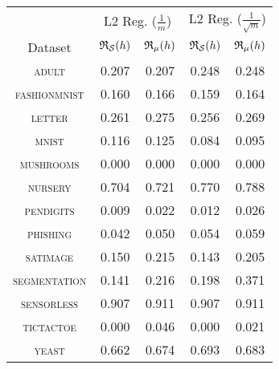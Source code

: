 \begin{tabular}{c|cc|cc}
\toprule
  & \multicolumn{2}{c}{L2 Reg. {\small ($\frac{1}{m}$)}} & \multicolumn{2}{c}{L2 Reg. {\small ($\frac{1}{\sqrt{m}}$)}} \\
Dataset & {\scriptsize $\mathfrak{R}_{\mathcal{S}}(h)$} & {\scriptsize $\mathfrak{R}_{\mu}(h)$} & {\scriptsize $\mathfrak{R}_{\mathcal{S}}(h)$} & {\scriptsize $\mathfrak{R}_{\mu}(h)$} \\
\midrule
\textsc{\footnotesize adult} & 0.207 & 0.207 & 0.248 & 0.248 \\
\textsc{\footnotesize fashionmnist} & 0.160 & 0.166 & 0.159 & 0.164 \\
\textsc{\footnotesize letter} & 0.261 & 0.275 & 0.256 & 0.269 \\
\textsc{\footnotesize mnist} & 0.116 & 0.125 & 0.084 & 0.095 \\
\textsc{\footnotesize mushrooms} & 0.000 & 0.000 & 0.000 & 0.000 \\
\textsc{\footnotesize nursery} & 0.704 & 0.721 & 0.770 & 0.788 \\
\textsc{\footnotesize pendigits} & 0.009 & 0.022 & 0.012 & 0.026 \\
\textsc{\footnotesize phishing} & 0.042 & 0.050 & 0.054 & 0.059 \\
\textsc{\footnotesize satimage} & 0.150 & 0.215 & 0.143 & 0.205 \\
\textsc{\footnotesize segmentation} & 0.141 & 0.216 & 0.198 & 0.371 \\
\textsc{\footnotesize sensorless} & 0.907 & 0.911 & 0.907 & 0.911 \\
\textsc{\footnotesize tictactoe} & 0.000 & 0.046 & 0.000 & 0.021 \\
\textsc{\footnotesize yeast} & 0.662 & 0.674 & 0.693 & 0.683 \\
\bottomrule
\end{tabular}